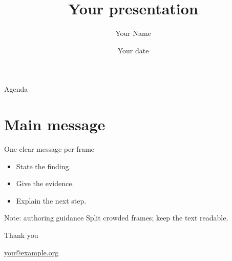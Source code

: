 \documentclass[11pt,aspectratio=169]{beamer}
\title[Your presentation]{Your presentation}
\author{Your Name}
\institute{Your Institute}
\date{Your date}
\begin{document}
\begin{frame}[plain]
  \titlepage
\end{frame}
\begin{frame}{Agenda}
  \tableofcontents
\end{frame}
\section{Main message}
\begin{frame}{One clear message per frame}
  \begin{itemize}
    \item State the finding.
    \item Give the evidence.
    \item Explain the next step.
  \end{itemize}
  \begin{block}{Note: authoring guidance}
    Split crowded frames; keep the text readable.
  \end{block}
\end{frame}
\begin{frame}[plain]
  \reportlogomark\par\bigskip
  {\textcolor{TempusAccent}{Thank you}}\par
  \medskip\href{mailto:you@example.org}{you@example.org}
\end{frame}
\end{document}
